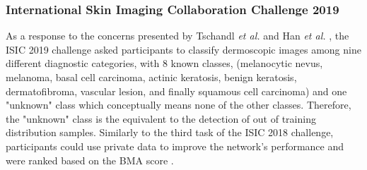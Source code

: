     \subsubsection{International Skin Imaging Collaboration Challenge 2019}
    As a response to the concerns presented by Tschandl \textit{et al.} \cite{humanvsisic2018} and Han \textit{et al.} \cite{Han2018}, the \ac{ISIC} 2019 challenge asked participants to classify dermoscopic images among nine different diagnostic categories, with 8 known classes, (melanocytic nevus, melanoma, basal cell carcinoma, actinic keratosis, benign keratosis, dermatofibroma, vascular lesion, and finally squamous cell carcinoma) and one "unknown" class which conceptually means none of the other classes. Therefore, the "unknown" class is the equivalent to the detection of out of training distribution samples. Similarly to the third task of the \ac{ISIC} 2018 challenge, participants could use private data to improve the network's performance and were ranked based on the \ac{BMA} score \cite{isic2019}. \par
    
